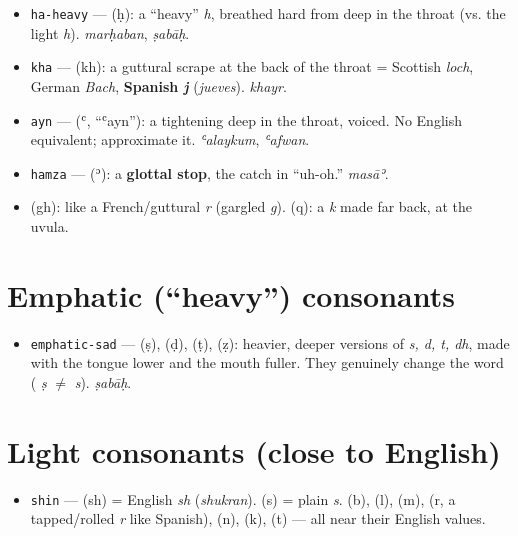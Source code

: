 \begin{itemize}
\raggedright
\setlength{\itemsep}{0.35em}
  \item \texttt{ha-heavy} — \textbf{} (ḥ): a \textquotedblleft{}heavy\textquotedblright{} \emph{h}, breathed hard from deep in the throat (vs. the light \textbf{} \emph{h}). \emph{marḥaban}, \emph{ṣabāḥ}.
  \item \texttt{kha} — \textbf{} (kh): a guttural scrape at the back of the throat = Scottish \emph{loch}, German \emph{Bach}, \textbf{Spanish \emph{j}} (\emph{jueves}). \emph{khayr}.
  \item \texttt{ayn} — \textbf{} (ʿ, \textquotedblleft{}ʿayn\textquotedblright{}): a tightening deep in the throat, voiced. No English equivalent; approximate it. \emph{ʿalaykum}, \emph{ʿafwan}.
  \item \texttt{hamza} — \textbf{} (ʾ): a \textbf{glottal stop}, the catch in \textquotedblleft{}uh-oh.\textquotedblright{} \emph{masāʾ}.
  \item \textbf{} (gh): like a French/guttural \emph{r} (gargled \emph{g}). \textbf{} (q): a \emph{k} made far back, at the uvula.
\end{itemize}

\section*{Emphatic (\textquotedblleft{}heavy\textquotedblright{}) consonants}

\begin{itemize}
\raggedright
\setlength{\itemsep}{0.35em}
  \item \texttt{emphatic-sad} — \textbf{} (ṣ), \textbf{} (ḍ), \textbf{} (ṭ), \textbf{} (ẓ): heavier, deeper versions of \emph{s, d, t, dh}, made with the tongue lower and the mouth fuller. They genuinely change the word ( \emph{ṣ} $\neq$  \emph{s}). \emph{ṣabāḥ}.
\end{itemize}

\section*{Light consonants (close to English)}

\begin{itemize}
\raggedright
\setlength{\itemsep}{0.35em}
  \item \texttt{shin} — \textbf{} (sh) = English \emph{sh} (\emph{shukran}). \textbf{} (s) = plain \emph{s}. \textbf{} (b), \textbf{} (l), \textbf{} (m), \textbf{} (r, a tapped/rolled \emph{r} like Spanish), \textbf{} (n), \textbf{} (k), \textbf{} (t) — all near their English values.
\end{itemize}

